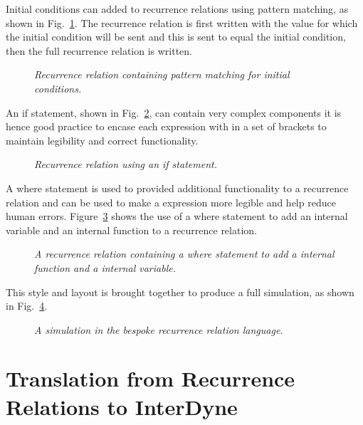 \documentclass{article}
\begin{document}
Initial conditions can added to recurrence relations using pattern matching, as shown in Fig.~\ref{fig:5exofla}. The recurrence relation is first written with the value for which the initial condition will be sent and this is sent to equal the initial condition, then the full recurrence relation is written.  
\begin{figure}[H]
	\centering
	
	\caption{\it Recurrence relation containing pattern matching for initial conditions.}
	\label{fig:5exofla}
\end{figure} 
 
An if statement, shown in Fig.~\ref{fig:6exofla}, can contain very complex components it is hence good practice to encase each expression with in a set of brackets to maintain legibility and correct functionality.  
\begin{figure}[H]
	\centering
	
	\caption{\it Recurrence relation using an if statement.}
	\label{fig:6exofla}
\end{figure} 
 
A where statement is used to provided additional functionality to a recurrence relation and can be used to make a expression more legible and help reduce human errors. Figure~\ref{fig:7exofla} shows the use of a where statement to add an internal variable and an internal function to a recurrence relation. 
\begin{figure}[H]
	\centering
	
	\caption{\it A recurrence relation containing a where statement to add a internal function and a internal variable.}
	\label{fig:7exofla}
\end{figure} 

This style and layout is brought together to produce a full simulation, as shown in Fig.~\ref{fig:8exofla}.
\begin{figure}[H]
	\centering
	
	\caption{\it A simulation in the bespoke recurrence relation language.}
	\label{fig:8exofla}
\end{figure} 







\section{Translation from Recurrence Relations to InterDyne} 
\end{document}
